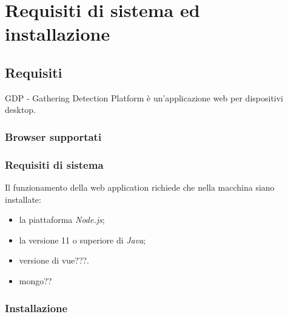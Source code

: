 \chapter{Requisiti di sistema ed installazione}\label{RequisitiDiSistemaEdInstallazione}

\section{Requisiti}\label{RequisitiDiSistemaEdInstallazioneRequisiti}
GDP - Gathering Detection Platform è un'applicazione web per dispositivi desktop.

\subsection{Browser supportati}\label{RequisitiDiSistemaEdInstallazioneRequisitiBrowserSupportati}

\subsection{Requisiti di sistema}\label{RequisitiDiSistemaEdInstallazioneRequisitiRequisitiDiSistema}

Il funzionamento della web application richiede che nella macchina siano installate:
\begin{itemize}
	\item la piattaforma \textit{Node.js};
	\item la versione 11 o superiore di \textit{Java};
	\item versione di vue???.
	\item mongo??
\end{itemize}

\subsection{Installazione}\label{RequisitiDiSistemaEdInstallazioneRequisitiInstallazione}